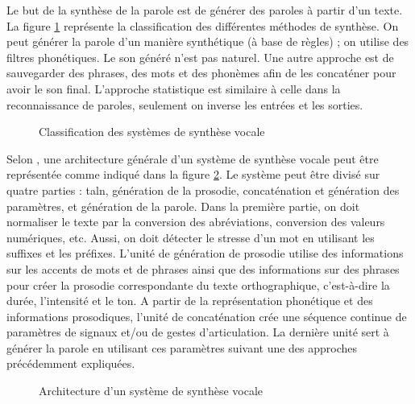 \documentclass{KodeBook}
\begin{document}
Le but de la synthèse de la parole est de générer des paroles à partir d'un texte. 
La figure \ref{fig:tts-classif} représente la classification des différentes méthodes de synthèse. 
On peut générer la parole d'un manière synthétique (à base de règles) ; on utilise des filtres phonétiques. 
Le son généré n'est pas naturel. 
Une autre approche est de sauvegarder des phrases, des mots et des phonèmes afin de les concaténer pour avoir le son final. 
L'approche statistique est similaire à celle dans la reconnaissance de paroles, seulement on inverse les entrées et les sorties. 

\begin{figure}[!ht]
	\centering
	\caption{Classification des systèmes de synthèse vocale}
	\label{fig:tts-classif}
\end{figure}

Selon \cite{2017-Hinterleitner}, une architecture générale d'un système de synthèse vocale peut être représentée comme indiqué dans la figure \ref{fig:tts-arch}. 
Le système peut être divisé sur quatre parties : \ac{taln}, génération de la prosodie, concaténation et génération des paramètres, et génération de la parole. 
Dans la première partie, on doit  normaliser le texte par la conversion des abréviations, conversion des valeurs numériques, etc. 
Aussi, on doit détecter le stresse d'un mot en utilisant les suffixes et les préfixes. 
L'unité de génération de prosodie utilise des informations sur les accents de mots et de phrases ainsi que des informations sur des phrases pour créer la prosodie correspondante du texte orthographique, c'est-à-dire la durée, l'intensité et le ton.
A partir de la représentation phonétique et des informations prosodiques, l'unité de concaténation crée une séquence continue de paramètres de signaux et/ou de gestes d'articulation.
La dernière unité sert à générer la parole en utilisant ces paramètres suivant une des approches précédemment expliquées.

\begin{figure}[!ht]
	\centering
	\caption{Architecture d'un système de synthèse vocale \cite{2017-Hinterleitner}}
	\label{fig:tts-arch}
\end{figure}


\begin{discussion}



\end{discussion}

\ifx\wholebook\relax\else
% 
% 
	
\end{document}
